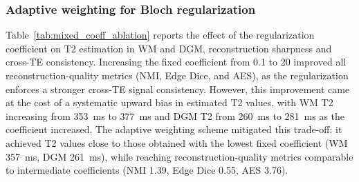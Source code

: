 \documentclass[preprint,authoryear,12pt]{elsarticle}
\begin{document}
\subsubsection{Adaptive weighting for Bloch regularization}

Table~\ref{tab:mixed_coeff_ablation} reports the effect of the regularization coefficient on T2 estimation in WM and DGM, reconstruction sharpness and cross-TE consistency. Increasing the fixed coefficient from 0.1 to 20 improved all reconstruction-quality metrics (NMI, Edge Dice, and AES), as the regularization enforces a stronger cross-TE signal consistency. However, this improvement came at the cost of a systematic upward bias in estimated T2 values, with WM T2 increasing from 353~ms to 377~ms and DGM T2 from 260~ms to 281~ms as the coefficient increased.  The adaptive weighting scheme mitigated this trade-off: it achieved T2 values close to those obtained with the lowest fixed coefficient (WM 357~ms, DGM 261~ms), while reaching reconstruction-quality metrics comparable to intermediate coefficients (NMI 1.39, Edge Dice 0.55, AES 3.76).

\begin{table}[t]
\centering
\caption{T$_2$ values and reconstruction quality metrics across Bloch regularization weights. AES is reported in units of $\times10^{-3}$.}
\label{tab:mixed_coeff_ablation}
\end{table}
 
\end{document}
